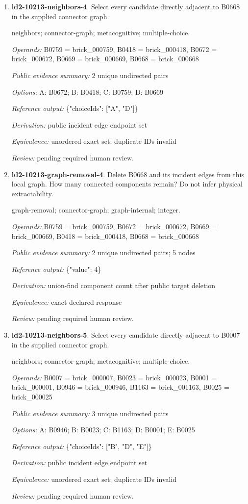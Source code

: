 \begin{enumerate}
\item \textbf{ld2-10213-neighbors-4}. Select every candidate directly adjacent to B0668 in the supplied connector graph.
\par{\small neighbors; connector-graph; metacognitive; multiple-choice.\par\textit{Operands:} B0759 = brick\_000759, B0418 = brick\_000418, B0672 = brick\_000672, B0669 = brick\_000669, B0668 = brick\_000668\par\textit{Public evidence summary:} 2 unique undirected pairs\par\textit{Options:} A: B0672; B: B0418; C: B0759; D: B0669\par\textit{Reference output:} \{"choiceIds": ["A", "D"]\}\par\textit{Derivation:} public incident edge endpoint set\par\textit{Equivalence:} unordered exact set; duplicate IDs invalid\par\textit{Review:} pending required human review.}
\item \textbf{ld2-10213-graph-removal-4}. Delete B0668 and its incident edges from this local graph. How many connected components remain? Do not infer physical extractability.
\par{\small graph-removal; connector-graph; graph-internal; integer.\par\textit{Operands:} B0759 = brick\_000759, B0672 = brick\_000672, B0669 = brick\_000669, B0418 = brick\_000418, B0668 = brick\_000668\par\textit{Public evidence summary:} 2 unique undirected pairs; 5 nodes\par\textit{Reference output:} \{"value": 4\}\par\textit{Derivation:} union-find component count after public target deletion\par\textit{Equivalence:} exact declared response\par\textit{Review:} pending required human review.}
\item \textbf{ld2-10213-neighbors-5}. Select every candidate directly adjacent to B0007 in the supplied connector graph.
\par{\small neighbors; connector-graph; metacognitive; multiple-choice.\par\textit{Operands:} B0007 = brick\_000007, B0023 = brick\_000023, B0001 = brick\_000001, B0946 = brick\_000946, B1163 = brick\_001163, B0025 = brick\_000025\par\textit{Public evidence summary:} 3 unique undirected pairs\par\textit{Options:} A: B0946; B: B0023; C: B1163; D: B0001; E: B0025\par\textit{Reference output:} \{"choiceIds": ["B", "D", "E"]\}\par\textit{Derivation:} public incident edge endpoint set\par\textit{Equivalence:} unordered exact set; duplicate IDs invalid\par\textit{Review:} pending required human review.}

\end{enumerate}
